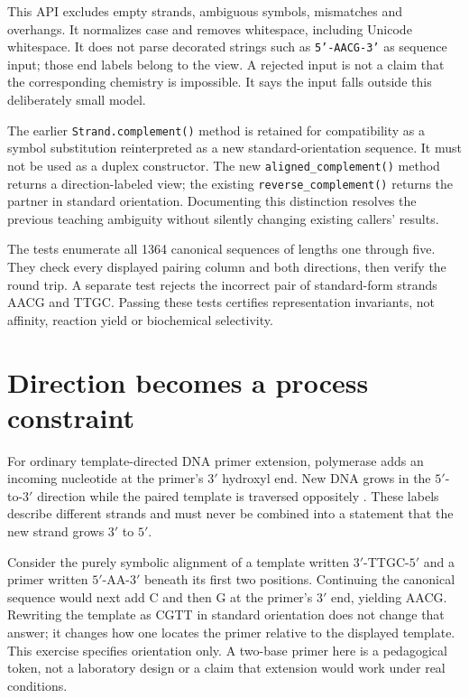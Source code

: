 This API excludes empty strands, ambiguous symbols, mismatches and overhangs.
It normalizes case and removes whitespace, including Unicode whitespace.
It does not parse decorated strings such as \texttt{5'-AACG-3'} as sequence
input; those end labels belong to the view. A rejected input is not a claim
that the corresponding chemistry is impossible. It says the input falls
outside this deliberately small model.

The earlier \texttt{Strand.complement()} method is retained for compatibility
as a symbol substitution reinterpreted as a new standard-orientation sequence.
It must not be used as a duplex constructor. The new
\texttt{aligned\_complement()} method returns a direction-labeled view; the
existing \texttt{reverse\_complement()} returns the partner in standard
orientation. Documenting this distinction resolves the previous teaching
ambiguity without silently changing existing callers' results.

The tests enumerate all 1364 canonical sequences of lengths one through five.
They check every displayed pairing column and both directions, then verify
the round trip. A separate test rejects the incorrect pair of standard-form
strands AACG and TTGC. Passing these tests certifies representation invariants,
not affinity, reaction yield or biochemical selectivity.

\section{Direction becomes a process constraint}
For ordinary template-directed DNA primer extension, polymerase adds an
incoming nucleotide at the primer's $3'$ hydroxyl end. New DNA grows in the
$5'$-to-$3'$ direction while the paired template is traversed oppositely
\citep{cooper2000replication}. These labels describe different strands and
must never be combined into a statement that the new strand grows $3'$ to $5'$.

Consider the purely symbolic alignment of a template written
$3'$-TTGC-$5'$ and a primer written $5'$-AA-$3'$ beneath its first two
positions. Continuing the canonical sequence would next add C and then G at
the primer's $3'$ end, yielding AACG. Rewriting the template as CGTT in
standard orientation does not change that answer; it changes how one locates
the primer relative to the displayed template. This exercise specifies
orientation only. A two-base primer here is a pedagogical token, not a
laboratory design or a claim that extension would work under real conditions.

